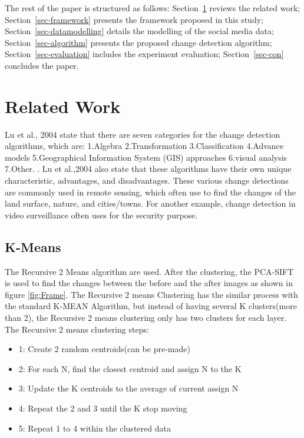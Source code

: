 \documentclass[runningheads,a4paper]{llncs}
\begin{document}
The rest of the paper is structured as follows:
Section~\ref{sec-bg} reviews the related work;
Section~\ref{sec-framework} presents the framework proposed in this study;
Section~\ref{sec-datamodelling} details the modelling of the social media data;
Section~\ref{sec-algorithm} presents the proposed change detection algorithm;
Section~\ref{sec-evaluation} includes the experiment evaluation;
Section~\ref{sec-con} concludes the paper. 

\section{Related Work}\label{sec-bg}
 Lu et al., 2004\cite{lu2004change} state that there are seven categories for the change detection algorithms, which are: 1.Algebra 2.Transformation 3.Classification 4.Advance models 5.Geographical Information System (GIS) approaches 6.visual analysis  7.Other. \cite{lu2004change}. Lu et al.,2004 \cite{lu2004change} also state that these algorithms have their own unique characteristic, advantages, and disadvantages. 
These various change detections are commonly used in remote sensing, which often use to find the changes of the land surface, nature, and cities/towns. For another example, change detection in video surveillance often uses for the security purpose.

\subsection{K-Means}

The Recursive 2 Means algorithm are used. 
After the clustering, the PCA-SIFT is used to find the changes between the before and the after images as shown in figure \ref{fig:Frame}.
The Recursive 2 means Clustering has the similar process with the standard K-MEAN Algorithm, but instead of having several K clusters(more than 2), the Recursive 2 means clustering only has two clusters for each layer\footnotemark.\\
The Recursive 2 means clustering steps:

\begin{itemize}
\item 1: Create 2 random centroids(can be pre-made)
\item 2: For each N, find the closest centroid and assign N to the K
\item 3: Update the K centroids to the average of current assign N
\item 4: Repeat the 2 and 3 until the K stop moving
\item 5: Repeat 1 to 4 within the clustered data
\end{itemize}
\end{document}
